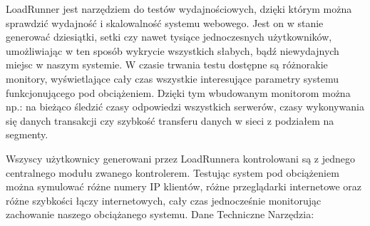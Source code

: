 LoadRunner jest narzędziem do testów wydajnościowych, dzięki którym można sprawdzić wydajność i skalowalność systemu webowego.
Jest on w stanie generować dziesiątki, setki czy nawet tysiące jednoczesnych użytkowników, umożliwiając w ten sposób wykrycie 
wszystkich słabych, bądź niewydajnych miejsc w naszym systemie. W czasie trwania testu dostępne są różnorakie 
monitory, wyświetlające cały czas wszystkie interesujące parametry systemu funkcjonującego pod obciążeniem. Dzięki 
tym wbudowanym monitorom można np.:  na bieżąco śledzić czasy odpowiedzi wszystkich serwerów, czasy wykonywania się danych 
transakcji czy szybkość transferu danych w sieci z podziałem na segmenty.

Wszyscy użytkownicy generowani przez LoadRunnera kontrolowani są z jednego centralnego modułu zwanego kontrolerem. Testując 
system pod obciążeniem można symulować różne numery IP klientów, różne przeglądarki internetowe oraz różne 
szybkości łączy internetowych, cały czas jednocześnie monitorując zachowanie naszego obciążanego systemu.
Dane Techniczne Narzędzia:
